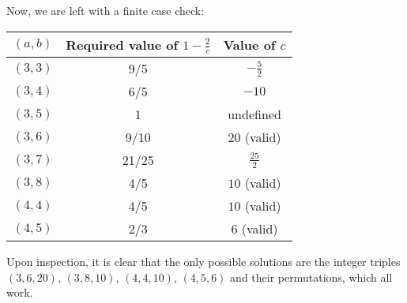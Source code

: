 \documentclass[10pt]{../usamts}
\begin{document}
\begin{solution}
Now, we are left with a finite case check:

\begin{center}
\begin{tabular}{c | c | c}
    $(a,b)$ & Required value of $1-\frac{2}{c}$ & Value of $c$\\\hline
    $(3,3)$ & 9/5 & $-\frac{5}{2}$ \\
    $(3,4)$ & 6/5 & $-10$ \\
    $(3,5)$ & 1 & undefined \\
    $(3,6)$ & 9/10 & $20$ (valid) \\
    $(3,7)$ & 21/25 & $\frac{25}{2}$ \\
    $(3,8)$ & 4/5 & $10$ (valid) \\
    $(4,4)$ & 4/5 & $10$ (valid) \\
    $(4,5)$ & 2/3 & $6$ (valid) \\
\end{tabular}
\end{center}

Upon inspection, it is clear that the only possible solutions are the integer triples $(3,6,20)$, $(3,8,10)$, $(4,4,10)$, $(4,5,6)$ and their permutations, which all work.

\end{solution}
\end{document}
